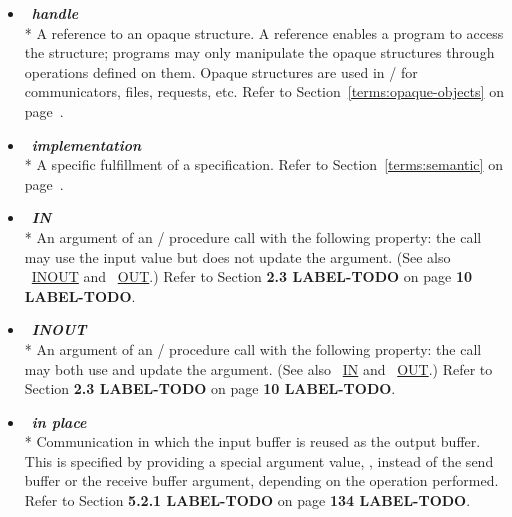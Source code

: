 \begin{itemize}
\label{glossary:handle}
\item  ~\hypertarget{glossary:handle}{\emph{\textbf{handle}}} \\*
A reference to an opaque structure. A reference enables a program to access the structure;
programs may only manipulate the opaque structures through operations defined on them. 
Opaque structures are used in \MPI/ for communicators, files, requests, etc.
Refer to Section~\ref{terms:opaque-objects} on page~\pageref{terms:opaque-objects}.

\label{glossary:implementation}
\item  ~\hypertarget{glossary:implementation}{\emph{\textbf{implementation}}} \\*
A specific fulfillment of a specification.  
Refer to Section~\ref{terms:semantic} on page~\pageref{terms:semantic}.

\label{glossary:IN}
\item  ~\hypertarget{glossary:IN}{\emph{\textbf{IN}}} \\*
An argument of an \MPI/ procedure call with the following property: the call may use the input value but does 
not update the argument. 
(See also ~\hyperlink{glossary:INOUT}{INOUT} and ~\hyperlink{glossary:OUT}{OUT}.)
Refer to Section {\bf 2.3 LABEL-TODO} on page {\bf 10 LABEL-TODO}.

\label{glossary:INOUT}
\item  ~\hypertarget{glossary:INOUT}{\emph{\textbf{INOUT}}} \\*
An argument of an \MPI/ procedure call with the following property: the call may both use and update the argument.
(See also ~\hyperlink{glossary:IN}{IN} and ~\hyperlink{glossary:OUT}{OUT}.)
Refer to Section {\bf 2.3 LABEL-TODO} on page {\bf 10 LABEL-TODO}.

\label{glossary:in_place}
\item  ~\hypertarget{glossary:in_place}{\emph{\textbf{in place}}} \\*
Communication in which the input buffer is reused as the output buffer.
This is specified by
providing a special argument value, , instead of the
send buffer or the receive buffer argument,
depending on the operation performed. 
Refer to Section {\bf 5.2.1 LABEL-TODO} on page {\bf 134 LABEL-TODO}.


\end{itemize}
